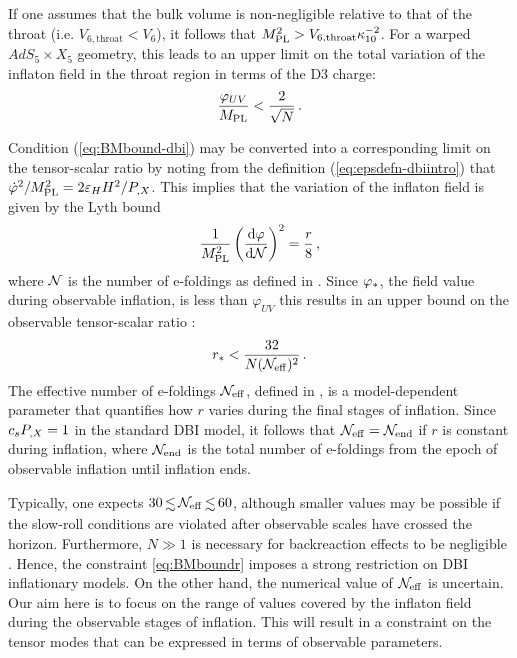 If one assumes that the bulk volume is 
non-negligible relative to 
that of the throat (i.e. $V_{6,\mathrm{throat}} < V_{6}$), 
it follows that $M_{\mathrm{PL}}^2> V_{6,\mathrm{throat}}\kappa_{10}^{-2}$. 
For a warped $AdS_5 \times X_5$ geometry, this leads to an 
upper limit on the total variation of the inflaton field in 
the throat region in terms of the D3 charge:
% 
\begin{equation}
\label{eq:BMbound-dbi}
\frac{\varphi_{UV}}{M_{\mathrm{PL}}}   < \frac{2}{\sqrt{N}} \,.
\end{equation}
% 


Condition (\ref{eq:BMbound-dbi}) may be converted into a 
corresponding limit on the tensor-scalar ratio by noting from 
the definition (\ref{eq:epsdefn-dbiintro})
that $\dot{\varphi}^2 /M_{\mathrm{PL}}^2 = 2\varepsilon_H H^2/P_{,X}$.
This implies that the variation of the inflaton field 
is given by the Lyth bound  
\cite{lyth,bmpaper}
% 
\begin{equation}
\label{eq:rtheory}
\frac{1}{M_{\mathrm{PL}}^2} \left( \frac{\mathrm{d}\varphi}{\mathrm{d} \mathcal{N}} \right)^2 =
\frac{r}{8} \,,
\end{equation}
% 
where $\mathcal{N}$ is the number of e-foldings as defined in . 
Since $\varphi_*$, the field value during observable inflation,  is
less than $\varphi_{UV}$
this results in an upper bound on the observable tensor-scalar ratio
\cite{bmpaper}: 
% 
\begin{equation}
\label{eq:BMboundr}
r_*  < \frac{32}{N (\mathcal{N}_\mathrm{eff})^2} \,.
\end{equation}
% 
The effective number of e-foldings $\mathcal{N}_\mathrm{eff}$, defined in
, 
is a model-dependent parameter that quantifies 
how $r$ varies during the final stages of inflation. Since $c_sP_{,X} = 1$ in the
standard DBI model, 
it follows that $\mathcal{N}_\mathrm{eff} = \mathcal{N}_\mathrm{end}$ if $r$ is constant during inflation,
where $\mathcal{N}_\mathrm{end}$ is the total number of e-foldings
from the epoch of observable inflation until inflation ends.


Typically, one expects $30 \, \lsim \, {\Neff} 
\, \lsim \, 60$, 
although smaller values may be possible if the slow-roll conditions are 
violated after observable scales have crossed the horizon. 
Furthermore, $N \gg 1$ is necessary 
for backreaction effects to be negligible \cite{bmpaper}. 
Hence, the constraint \eqref{eq:BMboundr} 
imposes a strong restriction on DBI inflationary models. 
On the other hand, the numerical value 
of $\mathcal{N}_\mathrm{eff}$ is uncertain.  
Our aim here is to focus on the range of values covered by the 
inflaton field during the observable stages of inflation. 
This will result in a constraint on the tensor modes that 
can be expressed in terms of observable parameters.  


